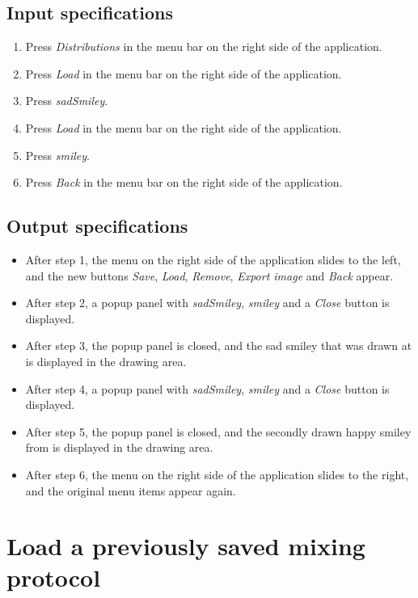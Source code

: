 \subsection*{Input specifications}
\begin{enumerate}
\item Press \emph{Distributions} in the menu bar on the right side of the application.
\item Press \emph{Load} in the menu bar on the right side of the application.
\item Press \emph{sadSmiley}.
\item Press \emph{Load} in the menu bar on the right side of the application.
\item Press \emph{smiley}.
\item Press \emph{Back} in the menu bar on the right side of the application.
\end{enumerate}

\subsection*{Output specifications}
\begin{itemize}
\item After step 1, the menu on the right side of the application slides to the left, and the new buttons \emph{Save}, \emph{Load}, \emph{Remove}, \emph{Export image} and \emph{Back} appear.
\item After step 2, a popup panel with \emph{sadSmiley}, \emph{smiley} and a \emph{Close} button is displayed.
\item After step 3, the popup panel is closed, and the sad smiley that was drawn at  is displayed in the drawing area.
\item After step 4, a popup panel with \emph{sadSmiley}, \emph{smiley} and a \emph{Close} button is displayed.
\item After step 5, the popup panel is closed, and the secondly drawn happy smiley from  is displayed in the drawing area.
\item After step 6, the menu on the right side of the application slides to the right, and the original menu items appear again.
\end{itemize}

\section{Load a previously saved mixing protocol}

